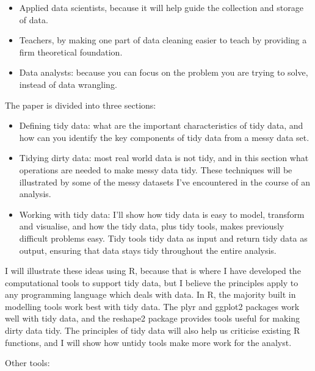 \documentclass[oneside]{article}
\begin{document}
\begin{itemize}

\item Applied data scientists, because it will help guide the collection and storage of data.

\item Teachers, by making one part of data cleaning easier to teach by providing a firm theoretical foundation.

\item Data analysts: because you can focus on the problem you are trying to solve, instead of data wrangling.

\end{itemize}

The paper is divided into three sections:

\begin{itemize}

\item Defining tidy data: what are the important characteristics of tidy data, and how can you identify the key components of tidy data from a messy data set.

\item Tidying dirty data: most real world data is not tidy, and in this section what operations are needed to make messy data tidy. These techniques will be illustrated by some of the messy datasets I've encountered in the course of an analysis.

\item Working with tidy data: I'll show how tidy data is easy to model, transform and visualise, and how the tidy data, plus tidy tools, makes previously difficult problems easy. Tidy tools tidy data as input and return tidy data as output, ensuring that data stays tidy throughout the entire analysis.

\end{itemize}

I will illustrate these ideas using R, because that is where I have developed the computational tools to support tidy data, but I believe the principles apply to any programming language which deals with data. In R, the majority built in modelling tools work best with tidy data. The plyr and ggplot2 \citep{me:ggplot2} packages work well with tidy data, and the reshape2 package provides tools useful for making dirty data tidy. The principles of tidy data will also help us criticise existing R functions, and I will show how untidy tools make more work for the analyst.

Other tools: \citep{kandel:2011}
\end{document}
